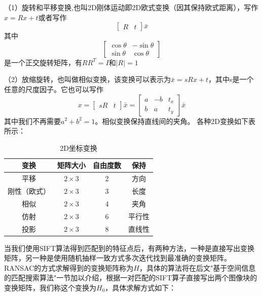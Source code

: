 （1）旋转和平移变换,也叫2D刚体运动即2D欧式变换（因其保持欧式距离），写作\(x={Rx+t}\)或者写作
\begin{equation}
	\begin{bmatrix}
	R & t
	\end{bmatrix}
	\bar{x}
\end{equation}
其中
\begin{equation}
	\begin{bmatrix}
	\cos{\theta} & -\sin{\theta} \\
	\sin{\theta} & \cos{\theta}
	\end{bmatrix}
\end{equation}
是一个正交旋转矩阵，有\(RR^T = I\)和\(|R| = 1\)

（2）放缩旋转，也叫做相似变换，该变换可以表示为\({\bar{x}}={sRx+t}\)，其中s是一个任意的尺度因子。它也可以写作
\begin{equation}
	x ={ 
	\begin{bmatrix}
	sR & t
	\end{bmatrix}
	\bar{x}
	}
	={
	\begin{bmatrix}
	a & -b & t_x \\
	b & a & t_y
	\end{bmatrix}
	\bar{x}
	}
\end{equation}
其中我们不再需要\(a^2 + b^2 = 1\)。相似变换保持直线间的夹角。
各种2D变换如下表所示：

\begin{table}[h]
\centering
\begin{tabular}{|c|c|c|c|}
\hline
\textbf{变换} & \textbf{矩阵大小} & \textbf{自由度数} & \textbf{保持} \\ \hline
平移          &   \(2\times{3}\)	& 2             & 方向          \\ \hline
刚性（欧式）    &   \(2\times{3}\) & 3             & 长度          \\ \hline
相似          &   \(2\times{3}\)  & 4             & 夹角          \\ \hline
仿射          &   \(2\times{3}\)  & 6             & 平行性         \\ \hline
投影          &   \(2\times{3}\)   & 8             & 直线性         \\ \hline
\end{tabular}
\caption{2D坐标变换}
\label{2dtrans}
\end{table}


当我们使用SIFT算法得到匹配到的特征点后，有两种方法，一种是直接写出变换矩阵，另一种是使用随机抽样一致方式多次迭代找到最准确的变换矩阵。RANSAC的方式求解得到的变换矩阵称为\(H\)，具体的算法将在后文"基于空间信息的匹配搜索算法"一节加以介绍，根据一对匹配的SIFT算子直接写出两个图像块的变换矩阵，我们称这个变换为\(H_0\)，具体求解方式如下：


